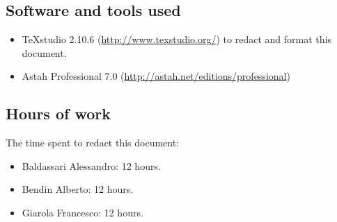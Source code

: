\documentclass[a4paper,11pt]{report} %
\begin{document}
		\subsection{Software and tools used}
		\begin{itemize}
			\item TeXstudio 2.10.6 (\href{http://www.texstudio.org/}{http://www.texstudio.org/}) to redact and format this document.
			\item Astah Professional 7.0 (\href{http://astah.net/editions/professional}{http://astah.net/editions/professional}) 
		\end{itemize}
		
		\subsection{Hours of work} The time spent to redact this document:
		\begin{itemize}
			\item Baldassari Alessandro: 12 hours.
			\item Bendin Alberto: 12 hours.
			\item Giarola Francesco: 12 hours.
		\end{itemize}
\end{document}
